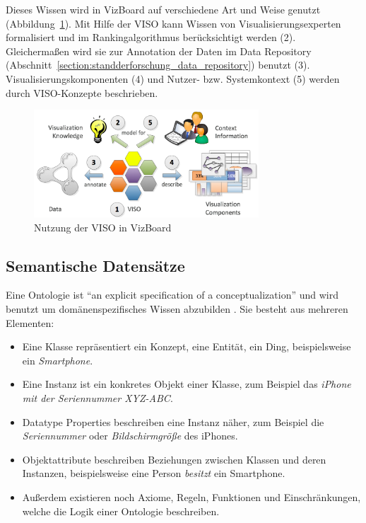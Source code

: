 \documentclass[
	headsepline,
	footsepline,
	fontsize=12pt,
	bibliography=totoc
]{scrbook}
\begin{document}
Dieses Wissen wird in VizBoard auf verschiedene Art und Weise genutzt (Abbildung~\ref{figure:viso}). Mit Hilfe der VISO kann Wissen von Visualisierungsexperten formalisiert und im Rankingalgorithmus berücksichtigt werden (2). Gleichermaßen wird sie zur Annotation der Daten im Data Repository (Abschnitt~\ref{section:standderforschung_data_repository}) benutzt (3). Visualisierungskomponenten (4) und Nutzer- bzw. Systemkontext (5) werden durch VISO-Konzepte beschrieben.

\begin{figure}[htbp]
	\centering
	\includegraphics[width=0.75\textwidth]{images/grundlagen-viso.png}
	\caption{Nutzung der VISO in VizBoard}
	\label{figure:viso}
\end{figure}

\subsection{Semantische Datensätze}
\label{section:standderforschung:grundlagen:semantische_daten}

Eine Ontologie ist \enquote{an explicit specification of a conceptualization} \cite{Gruber1995} und wird benutzt um domänenspezifisches Wissen abzubilden \cite{Chandrasekaran1999}. Sie besteht aus mehreren Elementen:

\begin{itemize}
	\item Eine Klasse repräsentiert ein Konzept, eine Entität, ein Ding, beispielsweise ein \textit{Smartphone}.
	\item Eine Instanz ist ein konkretes Objekt einer Klasse, zum Beispiel das \textit{iPhone mit der Seriennummer XYZ-ABC}.
	\item Datatype Properties beschreiben eine Instanz näher, zum Beispiel die \textit{Seriennummer} oder \textit{Bildschirmgröße} des iPhones.
	\item Objektattribute beschreiben Beziehungen zwischen Klassen und deren Instanzen, beispielsweise eine Person \textit{besitzt} ein Smartphone.
	\item Außerdem existieren noch Axiome, Regeln, Funktionen und Einschränkungen, welche die Logik einer Ontologie beschreiben.
\end{itemize}
\end{document}
